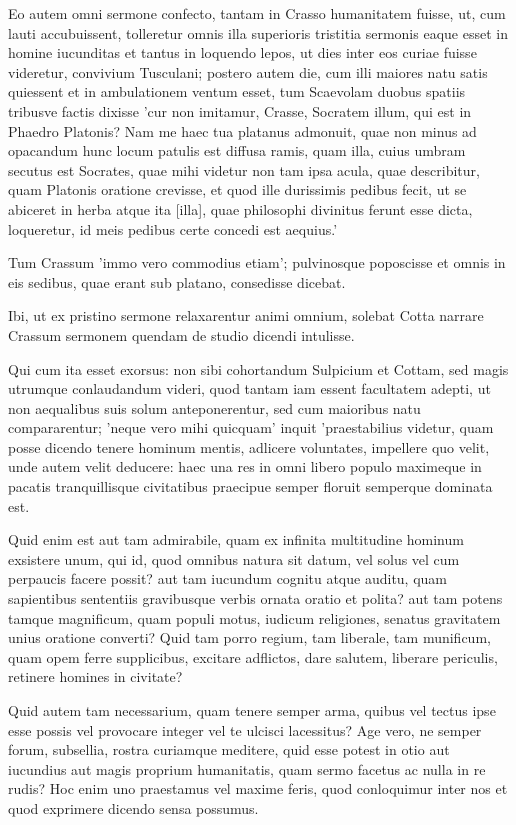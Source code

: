 Eo autem omni sermone confecto, tantam in Crasso humanitatem fuisse, ut, cum lauti accubuissent, tolleretur omnis illa superioris tristitia sermonis eaque esset in homine iucunditas et tantus in loquendo lepos, ut dies inter eos curiae fuisse videretur, convivium Tusculani; postero autem die, cum illi maiores natu satis quiessent et in ambulationem ventum esset, tum Scaevolam duobus spatiis tribusve factis dixisse 'cur non imitamur, Crasse, Socratem illum, qui est in Phaedro Platonis? Nam me haec tua platanus admonuit, quae non minus ad opacandum hunc locum patulis est diffusa ramis, quam illa, cuius umbram secutus est Socrates, quae mihi videtur non tam ipsa acula, quae describitur, quam Platonis oratione crevisse, et quod ille durissimis pedibus fecit, ut se abiceret in herba atque ita [illa], quae philosophi divinitus ferunt esse dicta, loqueretur, id meis pedibus certe concedi est aequius.'

Tum Crassum 'immo vero commodius etiam'; pulvinosque poposcisse et omnis in eis sedibus, quae erant sub platano, consedisse dicebat.

Ibi, ut ex pristino sermone relaxarentur animi omnium, solebat Cotta narrare Crassum sermonem quendam de studio dicendi intulisse.

Qui cum ita esset exorsus: non sibi cohortandum Sulpicium et Cottam, sed magis utrumque conlaudandum videri, quod tantam iam essent facultatem adepti, ut non aequalibus suis solum anteponerentur, sed cum maioribus natu compararentur; 'neque vero mihi quicquam' inquit 'praestabilius videtur, quam posse dicendo tenere hominum mentis, adlicere voluntates, impellere quo velit, unde autem velit deducere: haec una res in omni libero populo maximeque in pacatis tranquillisque civitatibus praecipue semper floruit semperque dominata est.

Quid enim est aut tam admirabile, quam ex infinita multitudine hominum exsistere unum, qui id, quod omnibus natura sit datum, vel solus vel cum perpaucis facere possit? aut tam iucundum cognitu atque auditu, quam sapientibus sententiis gravibusque verbis ornata oratio et polita? aut tam potens tamque magnificum, quam populi motus, iudicum religiones, senatus gravitatem unius oratione converti? Quid tam porro regium, tam liberale, tam munificum, quam opem ferre supplicibus, excitare adflictos, dare salutem, liberare periculis, retinere homines in civitate?

Quid autem tam necessarium, quam tenere semper arma, quibus vel tectus ipse esse possis vel provocare integer vel te ulcisci lacessitus? Age vero, ne semper forum, subsellia, rostra curiamque meditere, quid esse potest in otio aut iucundius aut magis proprium humanitatis, quam sermo facetus ac nulla in re rudis? Hoc enim uno praestamus vel maxime feris, quod conloquimur inter nos et quod exprimere dicendo sensa possumus.

